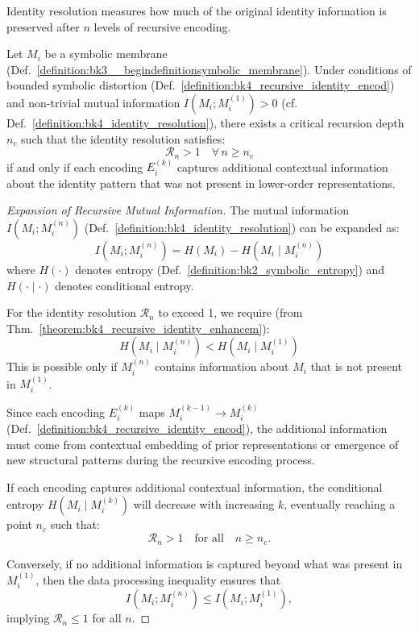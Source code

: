 Identity resolution measures how much of the original identity information is preserved after $n$ levels of recursive encoding.
\begin{theorem}
\label{theorem:bk4_recursive_identity_enhancem}
Let $M_i$ be a symbolic membrane (Def.~\ref{definition:bk3__begindefinitionsymbolic_membrane}). Under conditions of bounded symbolic distortion (Def.~\ref{definition:bk4_recursive_identity_encod}) and non-trivial mutual information $I(M_i; M_i^{(1)}) > 0$ (cf. Def.~\ref{definition:bk4_identity_resolution}), there exists a critical recursion depth $n_c$ such that the identity resolution satisfies:
\[
\mathcal{R}_n > 1 \quad \forall\, n \geq n_c
\]
if and only if each encoding $E_i^{(k)}$ captures additional contextual information about the identity pattern that was not present in lower-order representations.
\end{theorem}
\begin{proof}[Expansion of Recursive Mutual Information]
\label{proof:bk4_mutual_information_expansion}
The mutual information $I(M_i; M_i^{(n)})$ (Def.~\ref{definition:bk4_identity_resolution}) can be expanded as:
\begin{equation}
    I(M_i; M_i^{(n)}) = H(M_i) - H(M_i \mid M_i^{(n)})
    \label{eq:bk4_mutual_information_entropy_proof}
\end{equation}
where $H(\cdot)$ denotes entropy (Def.~\ref{definition:bk2_symbolic_entropy}) and $H(\cdot \mid \cdot)$ denotes conditional entropy.

For the identity resolution $\mathcal{R}_n$ to exceed 1, we require (from Thm.~\ref{theorem:bk4_recursive_identity_enhancem}):
\begin{equation}
    H(M_i \mid M_i^{(n)}) < H(M_i \mid M_i^{(1)})
    \label{eq:bk4_conditional_entropy_inequality_proof}
\end{equation}
This is possible only if $M_i^{(n)}$ contains information about $M_i$ that is not present in $M_i^{(1)}$.

Since each encoding $E_i^{(k)}$ maps $M_i^{(k-1)} \to M_i^{(k)}$ (Def.~\ref{definition:bk4_recursive_identity_encod}), the additional information must come from contextual embedding of prior representations or emergence of new structural patterns during the recursive encoding process.

If each encoding captures additional contextual information, the conditional entropy
\( H(M_i \mid M_i^{(k)}) \) will decrease with increasing \( k \), eventually reaching a point \( n_c \)
such that:
\[
\mathcal{R}_n > 1 \quad \text{for all} \quad n \geq n_c.
\]

Conversely, if no additional information is captured beyond what was present in $M_i^{(1)}$, then the data processing inequality ensures that
\[
I(M_i; M_i^{(n)}) \leq I(M_i; M_i^{(1)}),
\]
implying $\mathcal{R}_n \leq 1$ for all $n$.
\end{proof}
